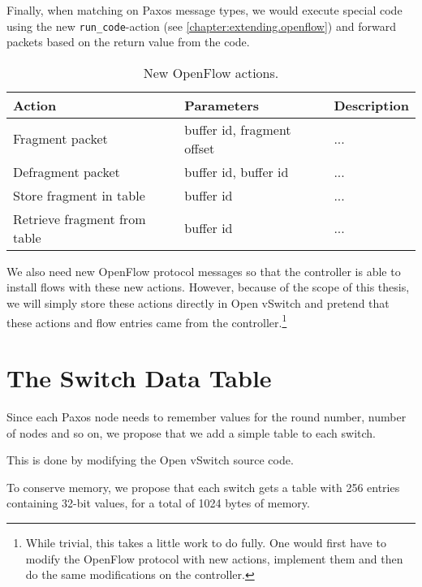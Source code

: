 Finally, when matching on Paxos message types, we would execute 
special code using the new \texttt{run\_{}code}-action (see
    \vref{chapter:extending.openflow})
 and forward packets based on the return value from the code.

\begin{table}[H]
  \centering
  \begin{tabular}{|l|l|l|}
    \hline \textbf{Action} & \textbf{Parameters} & \textbf{Description} \\
    \hline Fragment packet & buffer id, fragment offset & ... \\
    \hline Defragment packet & buffer id, buffer id & ... \\
    \hline Store fragment in table & buffer id & ... \\
    \hline Retrieve fragment from table & buffer id & ... \\
    \hline
  \end{tabular}

  \caption{New OpenFlow actions.}
  \label{table:openflow.new.actions}
\end{table}

We also need new OpenFlow protocol messages so that the controller is able
to install flows with these new actions.  However, because of the scope of
this thesis, we will simply store these actions directly in Open
vSwitch and
pretend that these actions and flow entries came from the
controller.\footnote{While trivial, this takes a little work to do fully.
One would first have to modify the OpenFlow protocol with new
  actions,
implement them and then do the same modifications on the controller.}

\section{The Switch Data Table}

Since each Paxos node needs to remember values for the round
number, number
of nodes and so on, we propose that we add a simple table to each switch.

This is done by modifying the Open vSwitch source code.

To conserve memory, we propose that each switch gets a table with 256
entries containing 32-bit values, for a total of 1024 bytes of memory.

